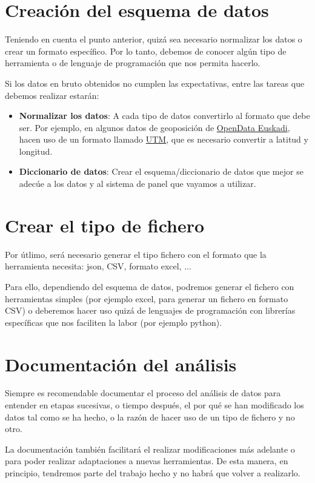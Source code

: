 \section{Creación del esquema de datos}
Teniendo en cuenta el punto anterior, quizá sea necesario normalizar los datos o crear un formato específico. Por lo tanto, debemos de conocer algún tipo de herramienta o de lenguaje de programación que nos permita hacerlo.

Si los datos en bruto obtenidos no cumplen las expectativas, entre las tareas que debemos realizar estarán:

\begin{itemize}
    \item \textbf{Normalizar los datos}: A cada tipo de datos convertirlo al formato que debe ser. Por ejemplo, en algunos datos de geoposición de \href{https://opendata.euskadi.eus/inicio/}{OpenData Euskadi}, hacen uso de un formato llamado \href{https://en.wikipedia.org/wiki/Universal_Transverse_Mercator_coordinate_system}{UTM}, que es necesario convertir a latitud y longitud.
    \item \textbf{Diccionario de datos}: Crear el esquema/diccionario de datos que mejor se adecúe a los datos y al sistema de panel que vayamos a utilizar.

\end{itemize}

\section{Crear el tipo de fichero}
Por útlimo, será necesario generar el tipo fichero con el formato que la herramienta necesita: json, CSV, formato excel, ...

Para ello, dependiendo del esquema de datos, podremos generar el fichero con herramientas simples (por ejemplo excel, para generar un fichero en formato CSV) o deberemos hacer uso quizá de lenguajes de programación con librerías específicas que nos faciliten la labor (por ejemplo python).

\section{Documentación del análisis}
Siempre es recomendable documentar el proceso del análisis de datos para entender en etapas sucesivas, o tiempo después, el por qué se han modificado los datos tal como se ha hecho, o la razón de hacer uso de un tipo de fichero y no otro.

La documentación también facilitará el realizar modificaciones más adelante o para poder realizar adaptaciones a nuevas herramientas. De esta manera, en principio, tendremos parte del trabajo hecho y no habrá que volver a realizarlo.

